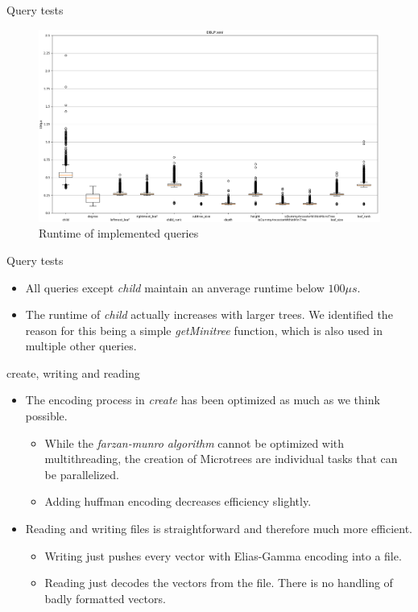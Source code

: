 \documentclass{beamer}
\begin{document}
\begin{frame}{Query tests}
	\begin{figure}[H]
	\includegraphics[scale=0.25]{DBLP_Queries}
	\caption{Runtime of implemented queries}
	\label{complexQue:image1}
	\end{figure}
\end{frame}

\begin{frame}{Query tests}
	\begin{itemize}
	\item
		All queries except \textit{child} maintain an anverage runtime below $100 \mu s$.
	\item
		The runtime of \textit{child} actually increases with larger trees. We identified the reason for this being a simple \textit{getMinitree} function, which is also used in multiple other queries.
	\end{itemize}
\end{frame}

\begin{frame}{create, writing and reading}
	\begin{itemize}
	\item
		The encoding process in \textit{create} has been optimized as much as we think possible.
		\begin{itemize}
		\item
			While the \textit{farzan-munro algorithm} cannot be optimized with multithreading, the creation of Microtrees are individual tasks that can be parallelized.
		\item
			Adding huffman encoding decreases efficiency slightly.
		\end{itemize}
	\item
		Reading and writing files is straightforward and therefore much more efficient.
		\begin{itemize}
		\item
			 Writing just pushes every vector with Elias-Gamma encoding into a file.
		\item
			Reading just decodes the vectors from the file. There is no handling of badly formatted vectors.
		\end{itemize}
	\end{itemize}
\end{frame}
\end{document}
